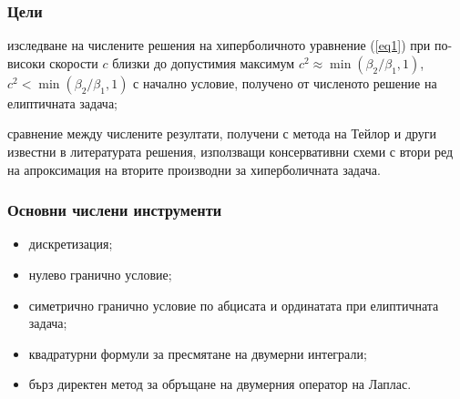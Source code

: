 \documentclass{beamer}
\newcommand{\rf}[1]{(\ref{#1})}
\begin{document}
\begin{frame}
\frametitle{Цели }
\begin{itemize}
{%
  \item изследване на числените решения на хиперболичното уравнение \rf{eq1} при по-високи скорости $c$ близки до допустимия максимум $c^2 \approx \min ({\beta_2}/ {\beta_1},1)$, $c^2 < \min ({\beta_2}/ {\beta_1},1)$ с начално условие, получено от численото решение на елиптичната задача;
  \item сравнение между числените резултати, получени с метода на Тейлор и други известни в литературата решения, използващи консервативни схеми с втори ред на апроксимация на вторите производни за хиперболичната задача.
  }
\end{itemize}
\end{frame}

\begin{frame}
\frametitle{Основни числени инструменти } 
 
\begin{itemize}
  \item дискретизация;
  \item нулево гранично условие;
  \item симетрично гранично условие по абцисата и ординатата при елиптичната задача;
  \item квадратурни формули за пресмятане на двумерни интеграли;
  \item бърз директен метод за обръщане на двумерния оператор на Лаплас.
\end{itemize}

\end{frame}
\end{document}
